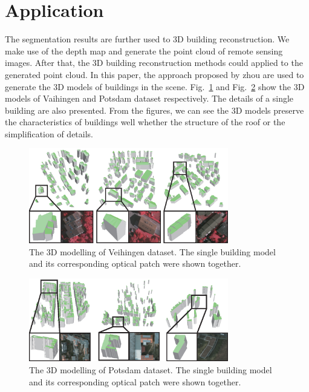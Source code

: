 \section{Application}
\label{sec:app}
 The segmentation results are further used to 3D building reconstruction. We make use of the depth map and generate the point cloud of remote sensing images. After that, the 3D building reconstruction methods could applied to the generated point cloud. In this paper, the approach proposed by zhou\cite{IEEEexample:zhou20112} are used to generate the 3D models of buildings in the scene. Fig.~\ref{fig:Vaihingen-3Dmodeling}
and Fig.~\ref{fig:Potsdam-3Dmodeling} show the 3D models of Vaihingen and Potsdam dataset respectively. The details of a single building are also presented. From the figures, we can see the 3D models preserve the characteristics of buildings well whether the structure of the roof or the simplification of details.
\begin{figure}
\centering
\includegraphics[width=8.7cm]{Figures/Vaihigen_3Dmodelling.eps}
\caption{The 3D modelling of Veihingen dataset. The single building model and its corresponding optical patch were shown together.}
\label{fig:Vaihingen-3Dmodeling}
\end{figure}

\begin{figure}
\centering
\includegraphics[width=8.7cm]{Figures/potsdam_models.eps}
\caption{The 3D modelling of Potsdam dataset. The single building model and its corresponding optical patch were shown together.}
\label{fig:Potsdam-3Dmodeling}
\end{figure}

